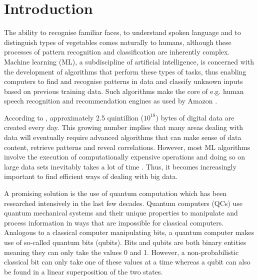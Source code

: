  \cleardoublepage

\chapter{Introduction}\label{sec:introduction}

The ability to recognise familiar faces, to understand spoken language and to distinguish types of vegetables comes naturally to humans, although these processes of pattern recognition and classification are inherently complex. Machine learning (ML), a subdiscipline of artificial intelligence, is concerned with the development of algorithms that perform these types of tasks, thus enabling computers to find and recognise patterns in data and classify unknown inputs based on previous training data. Such algorithms make the core of e.g. human speech recognition and recommendation engines as used by Amazon \cite{graves2013speech,linden2003amazon}.

According to , approximately 2.5 quintillion (${10}^{18}$) bytes of digital data are created every day. This growing number implies that many areas dealing with data will eventually require advanced algorithms that can make sense of data content, retrieve patterns and reveal correlations. However, most ML algorithms involve the execution of computationally expensive operations and doing so on large data sets inevitably takes a lot of time \cite{bekkerman2011scaling}. Thus, it becomes increasingly important to find efficient ways of dealing with big data.

A promising solution is the use of quantum computation which has been researched intensively in the last few decades. Quantum computers (QCs) use quantum mechanical systems and their unique properties to manipulate and process information in ways that are impossible for classical computers. Analogous to a classical computer manipulating bits, a quantum computer makes use of so-called quantum bits (qubits). Bits and qubits are both binary entities meaning they can only take the values 0 and 1. However, a non-probabilistic classical bit can only take one of these values at a time whereas a qubit can also be found in a linear superposition of the two states.


